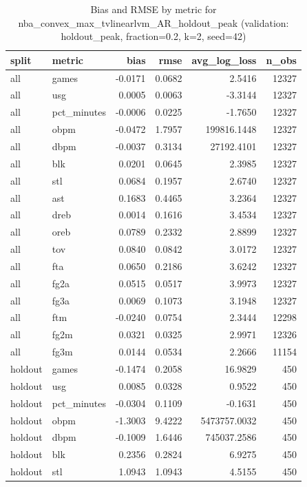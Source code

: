 \begin{table}
\caption{Bias and RMSE by metric for nba_convex_max_tvlinearlvm_AR_holdout_peak (validation: holdout_peak, fraction=0.2, k=2, seed=42)}
\label{tab:nba_convex_max_tvlinearlvm_AR_holdout_peak_vs_holdout_peak_f20_k2_s42_bias_rmse}
\begin{tabular}{llrrrr}
\toprule
split & metric & bias & rmse & avg\_log\_loss & n\_obs \\
\midrule
all & games & -0.0171 & 0.0682 & 2.5416 & 12327 \\
all & usg & 0.0005 & 0.0063 & -3.3144 & 12327 \\
all & pct\_minutes & -0.0006 & 0.0225 & -1.7650 & 12327 \\
all & obpm & -0.0472 & 1.7957 & 199816.1448 & 12327 \\
all & dbpm & -0.0037 & 0.3134 & 27192.4101 & 12327 \\
all & blk & 0.0201 & 0.0645 & 2.3985 & 12327 \\
all & stl & 0.0684 & 0.1957 & 2.6740 & 12327 \\
all & ast & 0.1683 & 0.4465 & 3.2364 & 12327 \\
all & dreb & 0.0014 & 0.1616 & 3.4534 & 12327 \\
all & oreb & 0.0789 & 0.2332 & 2.8899 & 12327 \\
all & tov & 0.0840 & 0.0842 & 3.0172 & 12327 \\
all & fta & 0.0650 & 0.2186 & 3.6242 & 12327 \\
all & fg2a & 0.0515 & 0.0517 & 3.9973 & 12327 \\
all & fg3a & 0.0069 & 0.1073 & 3.1948 & 12327 \\
all & ftm & -0.0240 & 0.0754 & 2.3444 & 12298 \\
all & fg2m & 0.0321 & 0.0325 & 2.9971 & 12326 \\
all & fg3m & 0.0144 & 0.0534 & 2.2666 & 11154 \\
holdout & games & -0.1474 & 0.2058 & 16.9829 & 450 \\
holdout & usg & 0.0085 & 0.0328 & 0.9522 & 450 \\
holdout & pct\_minutes & -0.0304 & 0.1109 & -0.1631 & 450 \\
holdout & obpm & -1.3003 & 9.4222 & 5473757.0032 & 450 \\
holdout & dbpm & -0.1009 & 1.6446 & 745037.2586 & 450 \\
holdout & blk & 0.2356 & 0.2824 & 6.9275 & 450 \\
holdout & stl & 1.0943 & 1.0943 & 4.5155 & 450 \\

\end{tabular}
\end{table}

